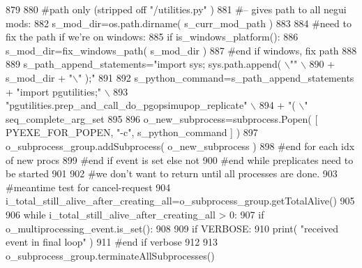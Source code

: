 \begin{DoxyCode}
879 
880                     \textcolor{comment}{#path only (stripped off "/utilities.py" )}
881                     \textcolor{comment}{#-- gives path to all negui mods:}
882                     s\_mod\_dir=os.path.dirname( s\_curr\_mod\_path )
883 
884                     \textcolor{comment}{#need to fix the path if we're on windows:}
885                     \textcolor{keywordflow}{if} is\_windows\_platform():
886                         s\_mod\_dir=fix\_windows\_path( s\_mod\_dir )
887                     \textcolor{comment}{#end if windows, fix path}
888                     
889                     s\_path\_append\_statements=\textcolor{stringliteral}{"import sys; sys.path.append( \(\backslash\)""} \(\backslash\)
890                             + s\_mod\_dir + \textcolor{stringliteral}{"\(\backslash\)" );"}
891 
892                     s\_python\_command=s\_path\_append\_statements + \textcolor{stringliteral}{"import pgutilities;"} \(\backslash\)
893                                         \textcolor{stringliteral}{"pgutilities.prep\_and\_call\_do\_pgopsimupop\_replicate"} \(\backslash\)
894                                         + \textcolor{stringliteral}{"( \(\backslash\)"%
      seq\_complete\_arg\_set
895 
896                     o\_new\_subprocess=subprocess.Popen( [ PYEXE\_FOR\_POPEN, \textcolor{stringliteral}{"-c"}, s\_python\_command ] )
897                     o\_subprocess\_group.addSubprocess( o\_new\_subprocess ) 
898                 \textcolor{comment}{#end for each idx of new procs}
899             \textcolor{comment}{#end if event is set else not}
900         \textcolor{comment}{#end while preplicates need to be started}
901 
902         \textcolor{comment}{#we don't want to return until all processes are done.}
903         \textcolor{comment}{#meantime test for cancel-request}
904         i\_total\_still\_alive\_after\_creating\_all=o\_subprocess\_group.getTotalAlive()
905 
906         \textcolor{keywordflow}{while} i\_total\_still\_alive\_after\_creating\_all > 0:
907             \textcolor{keywordflow}{if} o\_multiprocessing\_event.is\_set():
908 
909                 \textcolor{keywordflow}{if} VERBOSE:
910                     print( \textcolor{stringliteral}{"received event in final loop"} )
911                 \textcolor{comment}{#end if verbose}
912 
913                 o\_subprocess\_group.terminateAllSubprocesses()
}
\end{DoxyCode}
